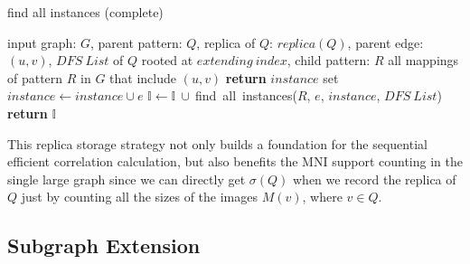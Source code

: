     \begin{algorithm}
	\caption{find all instances (complete)}\label{algo:complete-instances}
	\begin{algorithmic}[1] 
	\REQUIRE input graph: $G$, parent pattern: $Q$, replica of $Q$: $replica(Q)$, parent edge: $(u, v)$, $DFS\ List$ of $Q$ rooted at $extending\ index$, child pattern: $R$
	\ENSURE all mappings of pattern $R$ in $G$ that include $(u, v)$ 
	\STATE \textbf{return} $instance$ set 
	\ENDIF
	\STATE $instance\leftarrow instance\cup e$
	\STATE $\mathbb{I}\leftarrow \mathbb{I}\ \cup\ ${\sf find\ all\ instances($R$, $e$, $instance$, $DFS\ List$)}
	\ENDIF
	\ENDFOR
	\STATE \textbf{return} $\mathbb{I}$
	\end{algorithmic}
	\end{algorithm}

This replica storage strategy not only builds a foundation for the sequential efficient correlation calculation, but also benefits the MNI support counting in the single large graph since we can directly get $\sigma(Q)$ when we record the replica of $Q$ just by counting all the sizes of the images $M(v)$, where $v\in Q$.

\subsection{Subgraph Extension}
